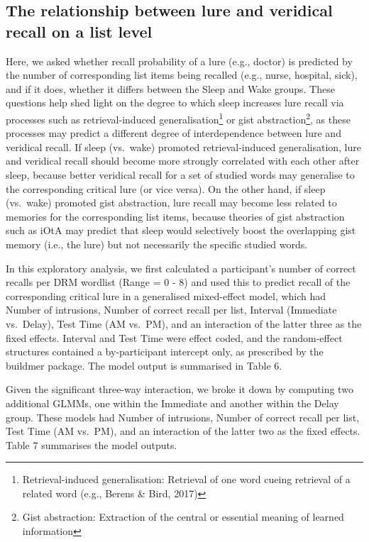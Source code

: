 \documentclass[
]{article}
\begin{document}
\hypertarget{the-relationship-between-lure-and-veridical-recall-on-a-list-level}{%
\subsection{The relationship between lure and veridical recall on a list level}\label{the-relationship-between-lure-and-veridical-recall-on-a-list-level}}

Here, we asked whether recall probability of a lure (e.g., doctor) is predicted by the number of corresponding list items being recalled (e.g., nurse, hospital, sick), and if it does, whether it differs between the Sleep and Wake groups. These questions help shed light on the degree to which sleep increases lure recall via processes such as retrieval-induced generalisation\footnote{Retrieval-induced generalisation: Retrieval of one word cueing retrieval of a related word (e.g., Berens \& Bird, 2017)} or gist abstraction\footnote{Gist abstraction: Extraction of the central or essential meaning of learned information}, as these processes may predict a different degree of interdependence between lure and veridical recall. If sleep (vs.~wake) promoted retrieval-induced generalisation, lure and veridical recall should become more strongly correlated with each other after sleep, because better veridical recall for a set of studied words may generalise to the corresponding critical lure (or vice versa). On the other hand, if sleep (vs.~wake) promoted gist abstraction, lure recall may become less related to memories for the corresponding list items, because theories of gist abstraction such as iOtA may predict that sleep would selectively boost the overlapping gist memory (i.e., the lure) but not necessarily the specific studied words.

In this exploratory analysis, we first calculated a participant's number of correct recalls per DRM wordlist (Range = 0 - 8) and used this to predict recall of the corresponding critical lure in a generalised mixed-effect model, which had Number of intrusions, Number of correct recall per list, Interval (Immediate vs.~Delay), Test Time (AM vs.~PM), and an interaction of the latter three as the fixed effects. Interval and Test Time were effect coded, and the random-effect structures contained a by-participant intercept only, as prescribed by the buildmer package. The model output is summarised in Table 6.

Given the significant three-way interaction, we broke it down by computing two additional GLMMs, one within the Immediate and another within the Delay group. These models had Number of intrusions, Number of correct recall per list, Test Time (AM vs.~PM), and an interaction of the latter two as the fixed effects. Table 7 summarises the model outputs.
\end{document}
